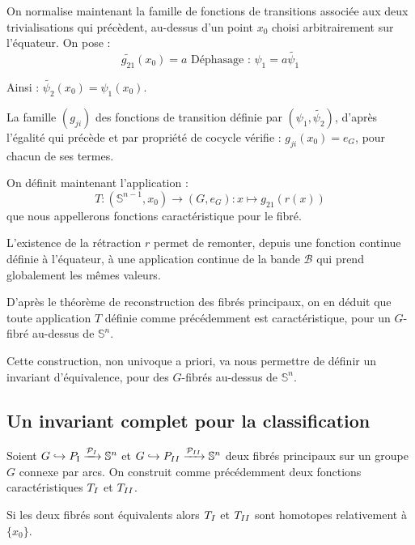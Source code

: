 \par
On normalise maintenant la famille de fonctions de transitions associée aux deux trivialisations qui précèdent, %
au-dessus d'un point $x_0$ choisi arbitrairement sur l'équateur. On pose :
\[\tilde{g_{21}}(x_0) = a\text{ Déphasage : }\psi_1 = a \tilde{\psi_1}\]

Ainsi : $\tilde{\psi_2}(x_0) = \psi_1(x_0)$.

La famille $(g_{ji})$ des fonctions de transition définie par $(\psi_1,\tilde{\psi_2})$, %
d'après l'égalité qui précède et par propriété de cocycle vérifie : $g_{ji}(x_0) = e_G$, pour chacun de ses termes.

\par
On définit maintenant l'application :
\[T : (\mathbb{S}^{n-1},x_0) \rightarrow (G,e_G) : x \mapsto g_{21}(r(x))\]
que nous appellerons fonctions caractéristique pour le fibré.

L'existence de la rétraction $r$ permet de remonter, depuis une fonction continue définie à l'équateur, %
à une application continue de la bande $\mathcal{B}$ qui prend globalement les mêmes valeurs.

\par
D'après le théorème de reconstruction des fibrés principaux, %
on en déduit que toute application $T$ définie comme précédemment est caractéristique, pour un $G$-fibré au-dessus de $\mathbb{S}^n$.

\par
Cette construction, non univoque a priori, va nous permettre de définir un invariant d'équivalence, pour des $G$-fibrés au-dessus de $\mathbb{S}^n$.

\subsection{Un invariant complet pour la classification}

\begin{theo}\label{tinv}
Soient $G \hookrightarrow P_\tc{\Rom{1}} \xrightarrow{\mathcal{P}_{\Rom{1}}} \mathbb{S}^n$ et $G \hookrightarrow P_{\Rom{2}} \xrightarrow{\mathcal{P}_{\Rom{2}}} \mathbb{S}^n$ %
deux fibrés principaux sur un groupe $G$ connexe par arcs. %
On construit comme précédemment deux fonctions caractéristiques $T_{\Rom{1}}$ et $T_{\Rom{2}}$.
\par
Si les deux fibrés sont équivalents alors $T_{\Rom{1}}$ et $T_{\Rom{2}}$ sont homotopes relativement à $\{x_0\}$.
\end{theo}

